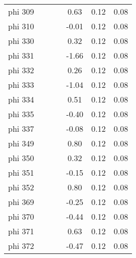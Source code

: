 \begin{table}[htp]
\begin{tabular}{ccccccc}
  phi 309 &  &  &  & 0.63 & 0.12 & 0.08 \\ 
  phi 310 &  &  &  & -0.01 & 0.12 & 0.08 \\ 
  phi 330 &  &  &  & 0.32 & 0.12 & 0.08 \\ 
  phi 331 &  &  &  & -1.66 & 0.12 & 0.08 \\ 
  phi 332 &  &  &  & 0.26 & 0.12 & 0.08 \\ 
  phi 333 &  &  &  & -1.04 & 0.12 & 0.08 \\ 
  phi 334 &  &  &  & 0.51 & 0.12 & 0.08 \\ 
  phi 335 &  &  &  & -0.40 & 0.12 & 0.08 \\ 
  phi 337 &  &  &  & -0.08 & 0.12 & 0.08 \\ 
  phi 349 &  &  &  & 0.80 & 0.12 & 0.08 \\ 
  phi 350 &  &  &  & 0.32 & 0.12 & 0.08 \\ 
  phi 351 &  &  &  & -0.15 & 0.12 & 0.08 \\ 
  phi 352 &  &  &  & 0.80 & 0.12 & 0.08 \\ 
  phi 369 &  &  &  & -0.25 & 0.12 & 0.08 \\ 
  phi 370 &  &  &  & -0.44 & 0.12 & 0.08 \\ 
  phi 371 &  &  &  & 0.63 & 0.12 & 0.08 \\ 
  phi 372 &  &  &  & -0.47 & 0.12 & 0.08 \\ 
   \hline
\end{tabular}
\end{table}
